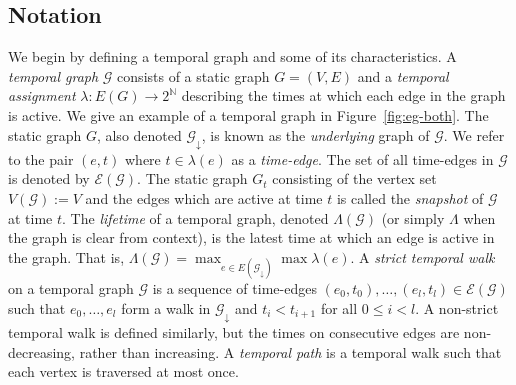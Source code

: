 \documentclass[a4paper,UKenglish,cleveref, autoref, thm-restate]{lipics-v2021} %
\begin{document}
\subsection{Notation}\label{sec:prelims}
We begin by defining a temporal graph and some of its characteristics. A \emph{temporal graph} $\mathcal{G}$ consists of a static graph $G=(V,E)$ and a \emph{temporal assignment} $\lambda:E(G)\to 2^{\mathbb{N}}$ describing the times at which each edge in the graph is active. We give an example of a temporal graph in Figure~\ref{fig:eg-both}. The static graph $G$, also denoted $\mathcal{G}_{\downarrow}$, is known as the \emph{underlying} graph of $\mathcal{G}$. We refer to the pair $(e,t)$ where $t\in\lambda(e)$ as a \emph{time-edge}. The set of all time-edges in $\mathcal{G}$ is denoted by $\mathcal{E}(\mathcal{G})$. The static graph $G_t$ consisting of the vertex set $V(\mathcal{G}):= V$ and the edges which are active at time $t$ is called the \emph{snapshot} of $\mathcal{G}$ at time $t$. The \emph{lifetime} of a temporal graph, denoted $\Lambda(\mathcal{G})$ (or simply $\Lambda$ when the graph is clear from context), is the latest time at which an edge is active in the graph. That is, $\Lambda(\mathcal{G})=\max_{e\in E(\mathcal{G}_{\downarrow})}\max\lambda(e)$.
A \emph{strict temporal walk} on a temporal graph $\mathcal{G}$ is a sequence of time-edges $(e_0,t_0),\ldots,(e_l,t_l)\in \mathcal{E}(\mathcal{G})$ such that $e_0,\ldots,e_l$ form a walk in $\mathcal{G}_{\downarrow}$ and
$t_i<t_{i+1}$ for all $0\leq i< l$. A non-strict temporal walk is defined similarly, but the times on consecutive edges are non-decreasing, rather than increasing. 
A \emph{temporal path} is a temporal walk such that each vertex is traversed at most once.
\end{document}

